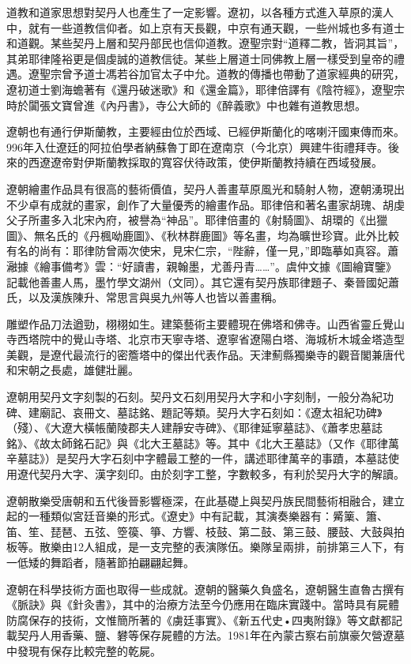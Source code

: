 道教和道家思想對契丹人也產生了一定影響。遼初，以各種方式進入草原的漢人中，就有一些道教信仰者。如上京有天長觀，中京有通天觀，一些州城也多有道士和道觀。某些契丹上層和契丹部民也信仰道教。遼聖宗對“道釋二教，皆洞其旨”，其弟耶律隆裕更是個虔誠的道教信徒。某些上層道士同佛教上層一樣受到皇帝的禮遇。遼聖宗曾予道士馮若谷加官太子中允。道教的傳播也帶動了道家經典的研究，遼初道士劉海蟾著有《還丹破迷歌》和《還金篇》，耶律倍譯有《陰符經》，遼聖宗時於闐張文寶曾進《內丹書》，寺公大師的《醉義歌》中也雜有道教思想。

遼朝也有通行伊斯蘭教，主要經由位於西域、已經伊斯蘭化的喀喇汗國東傳而來。996年入仕遼廷的阿拉伯學者納蘇魯丁即在遼南京（今北京）興建牛街禮拜寺。後來的西遼遼帝對伊斯蘭教採取的寬容伏待政策，使伊斯蘭教持續在西域發展。

遼朝繪畫作品具有很高的藝術價值，契丹人善畫草原風光和騎射人物，遼朝湧現出不少卓有成就的畫家，創作了大量優秀的繪畫作品。耶律倍和著名畫家胡瑰、胡虔父子所畫多入北宋內府，被譽為“神品”。耶律倍畫的《射騎圖》、胡環的《出獵圖》、無名氏的《丹楓呦鹿圖》、《秋林群鹿圖》等名畫，均為曠世珍寶。此外比較有名的尚有：耶律防曾兩次使宋，見宋仁宗，“陛辭，僅一見，”即臨摹如真容。蕭瀜據《繪事備考》雲：“好讀書，親翰墨，尤善丹青……”。虞仲文據《圖繪寶鑒》記載他善畫人馬，墨竹學文湖州（文同）。其它還有契丹族耶律題子、秦晉國妃蕭氏，以及漢族陳升、常思言與吳九州等人也皆以善畫稱。

雕塑作品刀法遒勁，栩栩如生。建築藝術主要體現在佛塔和佛寺。山西省靈丘覺山寺西塔院中的覺山寺塔、北京市天寧寺塔、遼寧省遼陽白塔、海城析木城金塔造型美觀，是遼代最流行的密簷塔中的傑出代表作品。天津薊縣獨樂寺的觀音閣兼唐代和宋朝之長處，雄健壯麗。

遼朝用契丹文字刻製的石刻。契丹文石刻用契丹大字和小字刻制，一般分為紀功碑、建廟記、哀冊文、墓誌銘、題記等類。契丹大字石刻如：《遼太祖紀功碑》（殘）、《大遼大橫帳蘭陵郡夫人建靜安寺碑》、《耶律延寧墓誌》、《蕭孝忠墓誌銘》、《故太師銘石記》與《北大王墓誌》等。其中《北大王墓誌》（又作《耶律萬辛墓誌》）是契丹大字石刻中字體最工整的一件，講述耶律萬辛的事蹟，本墓誌使用遼代契丹大字、漢字刻印。由於刻字工整，字數較多，有利於契丹大字的解讀。

遼朝散樂受唐朝和五代後晉影響極深，在此基礎上與契丹族民間藝術相融合，建立起的一種類似宮廷音樂的形式。《遼史》中有記載，其演奏樂器有：觱篥、簫、笛、笙、琵琶、五弦、箜篌、箏、方響、枝鼓、第二鼓、第三鼓、腰鼓、大鼓與拍板等。散樂由12人組成，是一支完整的表演隊伍。樂隊呈兩排，前排第三人下，有一低矮的舞蹈者，隨著節拍翩翩起舞。

遼朝在科學技術方面也取得一些成就。遼朝的醫藥久負盛名，遼朝醫生直魯古撰有《脈訣》與《針灸書》，其中的治療方法至今仍應用在臨床實踐中。當時具有屍體防腐保存的技術，文惟簡所著的《虜廷事實》、《新五代史•四夷附錄》等文獻都記載契丹人用香藥、鹽、礬等保存屍體的方法。1981年在內蒙古察右前旗豪欠營遼墓中發現有保存比較完整的乾屍。

